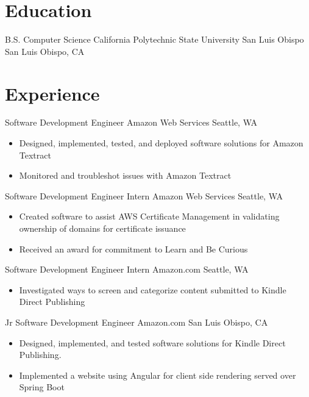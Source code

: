 \documentclass[11pt,a4paper,sans]{moderncv}
\begin{document}
\makecvtitle

\section{Education}
    {B.S. Computer Science}
    {California Polytechnic State University San Luis Obispo}
    {San Luis Obispo, CA}
    {}
    {}

\section{Experience}
    {Software Development Engineer}
    {Amazon Web Services}
    {Seattle, WA}
    {}
    {
        \begin{itemize}
            \item Designed, implemented, tested, and deployed software solutions for Amazon Textract
            \item Monitored and troubleshot issues with Amazon Textract
        \end{itemize}
    }
    {Software Development Engineer Intern}
    {Amazon Web Services}
    {Seattle, WA}
    {}
    {
        \begin{itemize}
            \item Created software to assist AWS Certificate Management in validating ownership of domains for certificate issuance
            \item Received an award for commitment to Learn and Be Curious
        \end{itemize}
    }
    {Software Development Engineer Intern}
    {Amazon.com}
    {Seattle, WA}
    {}
    {
        \begin{itemize}
            \item Investigated ways to screen and categorize content submitted to Kindle Direct Publishing
        \end{itemize}
    }
    {Jr Software Development Engineer}
    {Amazon.com}
    {San Luis Obispo, CA}
    {}
    {
        \begin{itemize}
            \item Designed, implemented, and tested software solutions for Kindle Direct Publishing.
            \item Implemented a website using Angular for client side rendering served over Spring Boot
        \end{itemize}
    }
\end{document}
